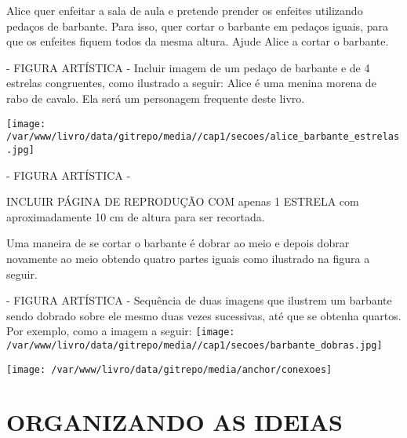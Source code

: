 \documentclass[a4paper,12pt,twoside]{book}
\begin{document}
Alice quer enfeitar a sala de aula e pretende prender os enfeites utilizando pedaços de barbante. Para isso, quer cortar o barbante em pedaços iguais, para que os enfeites fiquem todos da mesma altura. Ajude Alice a cortar o barbante.

\begin{imagem*}[breakable]{}{}    - FIGURA ARTÍSTICA - Incluir imagem de um pedaço de barbante e de 4 estrelas congruentes, como ilustrado a seguir:  
  Alice é uma menina morena de rabo de cavalo. Ela será um personagem frequente deste livro.  
  
    \texttt{[image: /var/www/livro/data/gitrepo/media//cap1/secoes/alice\_barbante\_estrelas.jpg]}  
\end{imagem*}

\begin{imagem*}[breakable]{}{}   - FIGURA ARTÍSTICA -  
  \begin{nota*}[breakable]{}{}         
    INCLUIR PÁGINA DE REPRODUÇÃO COM apenas 1 ESTRELA com aproximadamente 10 cm de altura para ser recortada.    
  \end{nota*}  
\end{imagem*}


\begin{resposta*}[breakable]{}{}   Uma maneira de se cortar o barbante é dobrar ao meio e depois dobrar novamente ao meio obtendo quatro partes iguais como ilustrado na figura a seguir.  
  \begin{imagem*}[breakable]{}{}     - FIGURA ARTÍSTICA - Sequência de duas imagens que ilustrem um barbante sendo dobrado sobre ele mesmo duas vezes sucessivas, até que se obtenha quartos. Por exemplo, como a imagem a seguir:    
        \texttt{[image: /var/www/livro/data/gitrepo/media//cap1/secoes/barbante\_dobras.jpg]}    
  \end{imagem*}  
\end{resposta*}



\texttt{[image: /var/www/livro/data/gitrepo/media/anchor/conexoes]}

\chapter{ ORGANIZANDO AS IDEIAS }
\end{document}
